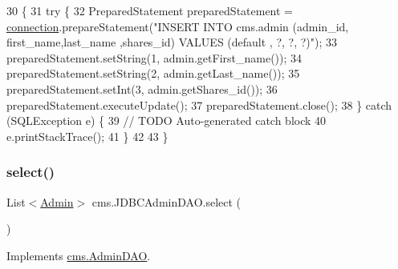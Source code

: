 \begin{DoxyCode}
30                                     \{
31         \textcolor{keywordflow}{try} \{
32             PreparedStatement preparedStatement = \mbox{\hyperlink{classcms_1_1_j_d_b_c_admin_d_a_o_a970f1be51071c85c0b1e55b45f21bcad}{connection}}.prepareStatement(\textcolor{stringliteral}{"INSERT INTO
       cms.admin (admin\_id, first\_name,last\_name ,shares\_id) VALUES (default , ?, ?, ?)"});
33             preparedStatement.setString(1,  admin.getFirst\_name());
34             preparedStatement.setString(2,  admin.getLast\_name());
35             preparedStatement.setInt(3,  admin.getShares\_id());
36             preparedStatement.executeUpdate();
37             preparedStatement.close();
38         \} \textcolor{keywordflow}{catch} (SQLException e) \{
39             \textcolor{comment}{// TODO Auto-generated catch block}
40             e.printStackTrace();
41         \}
42          
43     \}
\end{DoxyCode}
\mbox{\label{classcms_1_1_j_d_b_c_admin_d_a_o_a4cfb093895262f1b8a4ac7695cf50d74}} 
\subsubsection{\texorpdfstring{select()}{select()}}
{\footnotesize\ttfamily List$<$\mbox{\hyperlink{classcms_1_1_admin}{Admin}}$>$ cms.\+J\+D\+B\+C\+Admin\+D\+A\+O.\+select (\begin{DoxyParamCaption}{ }\end{DoxyParamCaption})\hspace{0.3cm}{\ttfamily [inline]}}



Implements \mbox{\hyperlink{interfacecms_1_1_admin_d_a_o_a3e45698575b289bb1772162a6f332d2e}{cms.\+Admin\+D\+AO}}.


